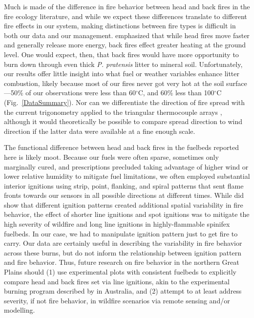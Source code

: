 \documentclass[referee, 
		     sn-basic]{sn-jnl}
\begin{document}
\begin{linenumbers}
Much is made of the difference in fire behavior between head and back
fires in the fire ecology literature, and while we expect these
differences translate to different fire effects in our system, making
distinctions between fire types is difficult in both our data and our
management. \citet{trollope1978} emphasized that while head fires move
faster and generally release more energy, back fires effect greater
heating at the ground level. One would expect, then, that back fires
would have more opportunity to burn down through even thick \emph{P.
pratensis} litter to mineral soil. Unfortunately, our results offer
little insight into what fuel or weather variables enhance litter
combustion, likely because most of our fires never got very hot at the
soil surface---50\% of our observations were less than 60\(^\circ\)C,
and 60\% less than 100\(^\circ\)C (Fig.~\ref{DataSummary}). 
Nor can we differentiate the direction of fire spread with the current trigonometry applied to the
triangular thermocouple arrays \citep{simard1984}, although it would
theoretically be possible to compare spread direction to wind direction
if the latter data were available at a fine enough scale.

The functional difference between head and back fires in the fuelbeds
reported here is likely moot. Because our fuels were often sparse,
sometimes only marginally cured, and prescriptions precluded taking
advantage of higher wind or lower relative humidity to mitigate fuel
limitations, we often employed substantial interior ignitions using
strip, point, flanking, and spiral patterns that sent flame fronts
towards our sensors in all possible directions at different times. While
\citet{williams2015} did show that different ignition patterns created
additional spatial variability in fire behavior, the effect of shorter
line ignitions and spot ignitions was to mitigate the high severity of
wildfire and long line ignitions in highly-flammable spinifex fuelbeds.
In our case, we had to manipulate ignition pattern just to get fire to
carry. Our data are certainly useful in describing the variability in
fire behavior across these burns, but do not inform the relationship
between ignition pattern and fire behavior. Thus, future research on
fire behavior in the northern Great Plains should (1) use experimental
plots with consistent fuelbeds to explicitly compare head and back fires
set via line ignitions, akin to the experimental burning program
described by \citet{cruz2015} in Australia, and (2) attempt to at least
address severity, if not fire behavior, in wildfire scenarios via remote
sensing and/or modelling.


\end{linenumbers}
\end{document}
